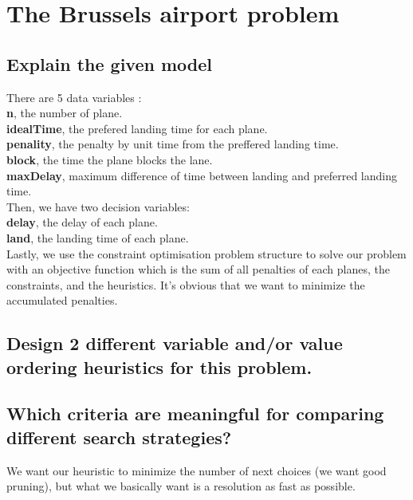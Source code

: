 \documentclass[a4paper ,12pt,french]{article}
\begin{document}
\tableofcontents %

\thispagestyle{fancy}

\pagebreak
\setcounter{page}{1}
\pagestyle{fancy} %

\section{The Brussels airport problem}

\subsection{Explain the given model}
There are 5 data variables :\\
\textbf{n}, the number of plane.\\
\textbf{idealTime}, the prefered landing time for each plane.\\
\textbf{penality}, the penalty by unit time from the preffered landing time.\\
\textbf{block}, the time the plane blocks the lane.\\
\textbf{maxDelay}, maximum difference of time between landing and preferred landing time.\\

Then, we have two decision variables:\\
\textbf{delay}, the delay of each plane.\\
\textbf{land}, the landing time of each plane.\\

Lastly, we use the constraint optimisation problem structure to solve our problem with an objective function which is the sum of all penalties of each planes, the constraints, and the heuristics.
It's obvious that we want to minimize the accumulated penalties.

\subsection{Design 2 different variable and/or value ordering heuristics for this problem.}

\subsection{Which criteria are meaningful for comparing different search strategies?}
We want our heuristic to minimize the number of next choices (we want good pruning), but what we basically want is a resolution as fast as possible.
\end{document}
